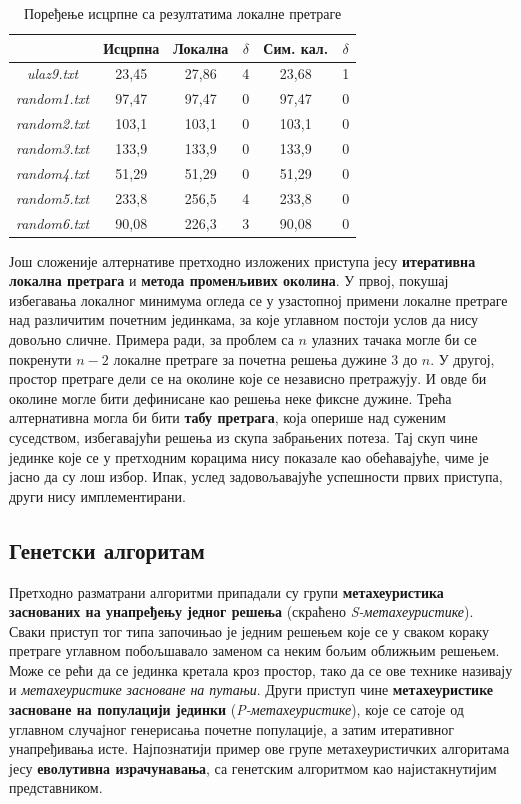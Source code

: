 \documentclass[a4paper]{article}
\begin{document}
\begin{table}[h!]
\begin{center}
\caption{Поређење исцрпне са резултатима локалне претраге}
\begin{tabular}{| c | c | c c | c c |} \hline
& Исцрпна & Локална & $\delta$ & Сим. кал. & $\delta$\\ \hline
\textit{ulaz9.txt} & 23,45 & 27,86 & 4 & 23,68 & 1\\
\textit{random1.txt} & 97,47 & 97,47 & 0 & 97,47 & 0\\
\textit{random2.txt} & 103,1 & 103,1 & 0 & 103,1 & 0\\
\textit{random3.txt} & 133,9 & 133,9 & 0 & 133,9 & 0\\
\textit{random4.txt} & 51,29 & 51,29 & 0 & 51,29 & 0\\
\textit{random5.txt} & 233,8 & 256,5 & 4 & 233,8 & 0\\
\textit{random6.txt} & 90,08 & 226,3 & 3 & 90,08 & 0\\ \hline
\end{tabular}
\label{lokalna}
\end{center}
\end{table}

Још сложеније алтернативе претходно изложених приступа јесу \textbf{итеративна локална претрага} и \textbf{метода променљивих околина}. У првој, покушај избегавања локалног минимума огледа се у узастопној примени локалне претраге над различитим почетним јединкама, за које углавном постоји услов да нису довољно сличне. Примера ради, за проблем са $n$ улазних тачака могле би се покренути $n-2$ локалне претраге за почетна решења дужине $3$ до $n$. У другој, простор претраге дели се на околине које се независно претражују. И овде би околине могле бити дефинисане као решења неке фиксне дужине. Трећа алтернативна могла би бити \textbf{табу претрага}, која оперише над суженим суседством, избегавајући решења из скупа забрањених потеза. Тај скуп чине јединке које се у претходним корацима нису показале као обећавајуће, чиме је јасно да су лош избор. Ипак, услед задовољавајуће успешности првих приступа, други нису имплементирани.

\subsection{Генетски алгоритам}

Претходно разматрани алгоритми припадали су групи \textbf{метахеуристика заснованих на унапређењу једног решења} (скраћено \textit{S-метахеуристике}). Сваки приступ тог типа започињао је једним решењем које се у сваком кораку претраге углавном побољшавало заменом са неким бољим оближњим решењем. Може се рећи да се јединка кретала кроз простор, тако да се ове технике називају и \textit{метахеуристике засноване на путањи}. Други приступ чине \textbf{метахеуристике засноване на популацији јединки} (\textit{P-метахеуристике}), које се сатоје од углавном случајног генерисања почетне популације, а затим итеративног унапређивања исте. Најпознатији пример ове групе метахеуристичких алгоритама јесу \textbf{еволутивна израчунавања}, са генетским алгоритмом као најистакнутијим представником.
\end{document}
